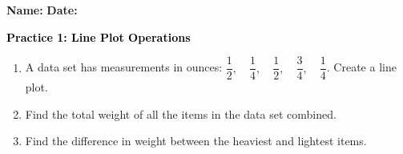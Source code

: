 \documentclass[12pt, letterpaper, fleqn]{article}
\begin{document}
\textbf{Name:} \underline{\hspace{5cm}}
\hfill
\textbf{Date:} \underline{\hspace{3cm}}\\

\begin{tcolorbox}[colback=customteal!20]
    \large\textcolor{black}{\textbf{Practice 1: Line Plot Operations}}
\end{tcolorbox}
\begin{enumerate}[itemsep=3.5cm, leftmargin=0.6cm]
\item A data set has measurements in ounces: $\dfrac{1}{2}, \quad \dfrac{1}{4}, \quad \dfrac{1}{2}, \quad \dfrac{3}{4}, \quad \dfrac{1}{4}$. Create a line plot.
\vspace{4cm}
\item Find the total weight of all the items in the data set combined.
\vspace{3cm}
\item Find the difference in weight between the heaviest and lightest items.
\end{enumerate}
\end{document}
